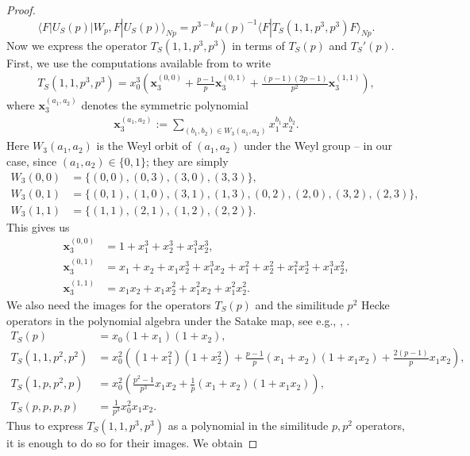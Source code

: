 \documentclass[11pt]{amsart}
\numberwithin{equation}{section}
\theoremstyle{plain}
\theoremstyle{definition}
\newcommand{\mf}{\mathbf}
\newcommand{\lan}{\langle }
\newcommand{\ran}{\rangle}
\begin{document}
\begin{proof}
\begin{equation}
    \lan F|U_S(p)|W_p, F|U_S(p) \ran_{Np} =  p^{3-k}\mu(p)^{-1} \lan F|T_S(1,1,p^3,p^3) F\ran_{Np}.
\end{equation}
Now we express the operator $T_S(1,1,p^3,p^3) $ in terms of $T_S(p)$ and $T_S'(p)$. First, we use the computations available from \cite{blo-pohl} to write
\begin{align}
    T_S(1,1,p^3,p^3) = x_0^3 \left( \mf x_3^{(0,0)} + \frac{p-1}{p}\mf x_3^{(0,1)} + \frac{(p-1)(2p-1)}{p^2}\mf x_3^{(1,1)} \right),
\end{align}
where $\mf x_3^{(a_1,a_2)}$ denotes the symmetric polynomial
\begin{align}
    \mf x_3^{(a_1,a_2)} := \sum_{(b_1,b_2) \in W_3(a_1,a_2)} x_1^{b_1} x_2^{b_2}.
\end{align}
Here $W_3(a_1,a_2)$ is the Weyl orbit of $(a_1,a_2)$ under the Weyl group -- in our case, since $(a_1,a_2) \in \{0,1\}$; they are simply
\begin{align}
    W_3(0,0) &=\{ (0,0), (0,3), (3,0), (3,3) \}, \\
    W_3(0,1) &=\{ (0,1), (1,0), (3,1), (1,3), (0,2), (2,0), (3,2), (2,3) \}, \\
    W_3(1,1) &=\{ (1,1), (2,1), (1,2), (2,2) \}.
\end{align} 
This gives us
\begin{align}
    \mf x_3^{(0,0)} &= 1+ x_1^3+x_2^3+x_1^3x_2^3, \\
     \mf x_3^{(0,1)} &= x_1+x_2+x_1x_2^3+x_1^3x_2 + x_1^2+x_2^2+ x_1^2x_2^3+x_1^3x_2^2,\\
      \mf x_3^{(1,1)} &= x_1x_2+ x_1x_2^2+x_1^2x_2+x_1^2x_2^2.
\end{align}
We also need the images for the operators $T_S(p)$ and the similitude $p^2$ Hecke operators in the polynomial algebra under the Satake map, see e.g., \cite{andrianov1, andrianov2}, \cite[Appendix]{blo-pohl}.
\begin{align}
    T_S(p) &= x_0(1+x_1)(1+x_2),\\
    T_S(1,1,p^2,p^2) &=  x_0^2 \left( (1+x_1^2)(1+x_2^2) + \frac{p-1}{p} (x_1+x_2)(1+x_1x_2) + \frac{2(p-1)}{p}  x_1x_2 \right), \\
    T_S(1,p,p^2,p) &= x_0^2 \left( \frac{p^2-1}{p^3} x_1x_2 + \frac{1}{p}(x_1+x_2)(1+x_1x_2) \right), \\
    T_S(p,p,p,p ) &= \frac{1}{p^3} x^2_0 x_1x_2.
    \end{align}
Thus to express $T_S(1,1,p^3,p^3)$ as a polynomial in the similitude $p,p^2$ operators, it is enough to do so for their images. We obtain

\end{proof}
\end{document}
